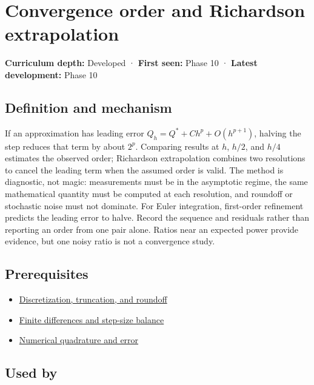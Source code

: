 \hypertarget{appendix-aca80b6bf17a}{}
\section{Convergence order and Richardson extrapolation}\label{appendix-aca80b6bf17a-convergence-order-and-richardson-extrapolation}

\textbf{Curriculum depth:} Developed · \textbf{First seen:} Phase 10 · \textbf{Latest development:} Phase 10

\subsection{Definition and mechanism}\label{appendix-aca80b6bf17a-definition-and-mechanism}

If an approximation has leading error \(Q_h=Q^*+Ch^p+O(h^{p+1})\), halving the step reduces that term by about \(2^p\). Comparing results at \(h\), \(h/2\), and \(h/4\) estimates the observed order; Richardson extrapolation combines two resolutions to cancel the leading term when the assumed order is valid. The method is diagnostic, not magic: measurements must be in the asymptotic regime, the same mathematical quantity must be computed at each resolution, and roundoff or stochastic noise must not dominate. For Euler integration, first-order refinement predicts the leading error to halve. Record the sequence and residuals rather than reporting an order from one pair alone. Ratios near an expected power provide evidence, but one noisy ratio is not a convergence study.

\subsection{Prerequisites}\label{appendix-aca80b6bf17a-prerequisites}

\begin{itemize}
\tightlist
\item
  \hyperref[appendix-6b0648b2b8e8]{Discretization, truncation, and roundoff}
\item
  \hyperref[appendix-e2d7b4f2161d]{Finite differences and step-size balance}
\item
  \hyperref[appendix-80521eae6b71]{Numerical quadrature and error}
\end{itemize}

\subsection{Used by}\label{appendix-aca80b6bf17a-used-by}

